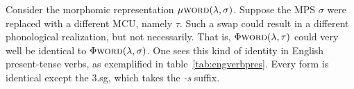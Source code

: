 Consider the morphomic 
representation       %
$\mu{\textsc{word}}(\lambda,\sigma)$. %
Suppose the \ac{MPS} $\sigma$ were replaced with a different \ac{MCU}, namely $\tau$. %
Such a swap could result in a different phonological realization, but not necessarily. 
That is, $\Phi{\textsc{word}}(\lambda,\tau)$ could very well be identical to 
 $\Phi{\textsc{word}}(\lambda,\sigma)$. One sees this kind of identity in English
 present-tense verbs, as exemplified in table~\ref{tab:engverbpres}. Every form is identical except the 3.sg, which takes the \textit{-s} suffix.%


